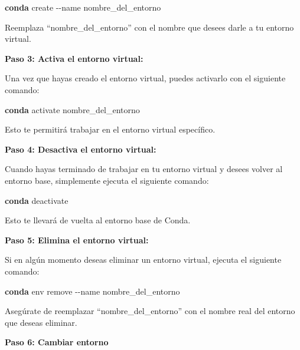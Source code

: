 \documentclass[
  a4paper,
]{article}
\newenvironment{Shaded}{}{}
\newcommand{\AttributeTok}[1]{\textcolor[rgb]{0.84,0.23,0.29}{#1}}
\newcommand{\ExtensionTok}[1]{\textcolor[rgb]{0.84,0.23,0.29}{\textbf{#1}}}
\newcommand{\NormalTok}[1]{\textcolor[rgb]{0.14,0.16,0.18}{#1}}
\begin{document}
\begin{Shaded}
\begin{Highlighting}[]
\ExtensionTok{conda}\NormalTok{ create }\AttributeTok{{-}{-}name}\NormalTok{ nombre\_del\_entorno}
\end{Highlighting}
\end{Shaded}

Reemplaza ``nombre\_del\_entorno'' con el nombre que desees darle a tu
entorno virtual.

\textbf{Paso 3: Activa el entorno virtual:}

Una vez que hayas creado el entorno virtual, puedes activarlo con el
siguiente comando:

\begin{Shaded}
\begin{Highlighting}[]
\ExtensionTok{conda}\NormalTok{ activate nombre\_del\_entorno}
\end{Highlighting}
\end{Shaded}

Esto te permitirá trabajar en el entorno virtual específico.

\textbf{Paso 4: Desactiva el entorno virtual:}

Cuando hayas terminado de trabajar en tu entorno virtual y desees volver
al entorno base, simplemente ejecuta el siguiente comando:

\begin{Shaded}
\begin{Highlighting}[]
\ExtensionTok{conda}\NormalTok{ deactivate}
\end{Highlighting}
\end{Shaded}

Esto te llevará de vuelta al entorno base de Conda.

\textbf{Paso 5: Elimina el entorno virtual:}

Si en algún momento deseas eliminar un entorno virtual, ejecuta el
siguiente comando:

\begin{Shaded}
\begin{Highlighting}[]
\ExtensionTok{conda}\NormalTok{ env remove }\AttributeTok{{-}{-}name}\NormalTok{ nombre\_del\_entorno}
\end{Highlighting}
\end{Shaded}

Asegúrate de reemplazar ``nombre\_del\_entorno'' con el nombre real del
entorno que deseas eliminar.

\textbf{Paso 6: Cambiar entorno}
\end{document}
